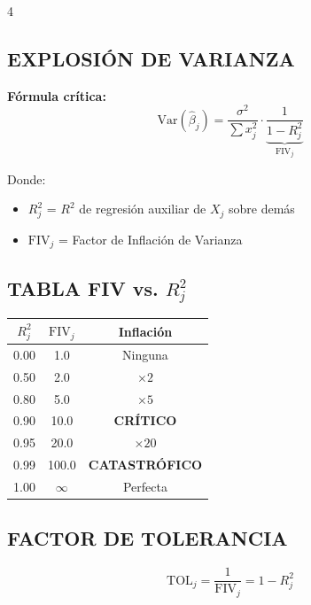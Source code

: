 \documentclass[6pt, landscape]{extarticle}
\newcommand{\Var}{\text{Var}}
\newcommand{\FIV}{\text{FIV}}
\newcommand{\TOL}{\text{TOL}}
\begin{document}
\begin{multicols*}{4}
\subsection{EXPLOSIÓN DE VARIANZA}

\begin{warningbox}
\textbf{Fórmula crítica:}
\vspace{-3pt}
$$\Var(\hat{\beta}_j) = \frac{\sigma^2}{\sum x_j^2} \cdot \underbrace{\frac{1}{1-R_j^2}}_{\FIV_j}$$
\vspace{-3pt}
\end{warningbox}

Donde:
\begin{itemize}
    \item $R_j^2$ = $R^2$ de regresión auxiliar de $X_j$ sobre demás
    \item $\FIV_j$ = Factor de Inflación de Varianza
\end{itemize}

\subsection{TABLA FIV vs. $R_j^2$}

\begin{center}
{\tiny
\begin{tabular}{@{}ccc@{}}
\toprule
$R_j^2$ & $\FIV_j$ & Inflación \\
\midrule
0.00 & 1.0 & Ninguna \\
0.50 & 2.0 & $\times 2$ \\
0.80 & 5.0 & $\times 5$ \\
\rowcolor{WarningBox}
0.90 & 10.0 & \textbf{CRÍTICO} \\
0.95 & 20.0 & $\times 20$ \\
\rowcolor{WarningBox}
0.99 & 100.0 & \textbf{CATASTRÓFICO} \\
1.00 & $\infty$ & Perfecta \\
\bottomrule
\end{tabular}
}
\end{center}

\subsection{FACTOR DE TOLERANCIA}

\begin{formulabox}
\vspace{-3pt}
$$\TOL_j = \frac{1}{\FIV_j} = 1 - R_j^2$$
\vspace{-3pt}
\end{formulabox}


\end{multicols*}
\end{document}
